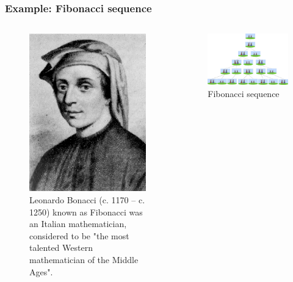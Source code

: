 \begin{frame}
\frametitle{Example: Fibonacci sequence}
\begin{columns}
	\begin{column}{0.35\linewidth}
		
\begin{figure}
\centering
\includegraphics[height=0.5\textheight]{Images/discrete_time_systems_7}
\caption{\tiny{Leonardo Bonacci (c. 1170 $–$ c. 1250) known as Fibonacci was an Italian mathematician, considered to be "the most talented Western mathematician of the Middle Ages".}}

\end{figure}
	\end{column}
	\begin{column}{0.65\linewidth}
\begin{figure}
\centering
\includegraphics[width=0.9\linewidth]{Images/discrete_time_systems_8}
\caption{Fibonacci sequence}
\end{figure}
	\end{column}
\end{columns}
\end{frame}

